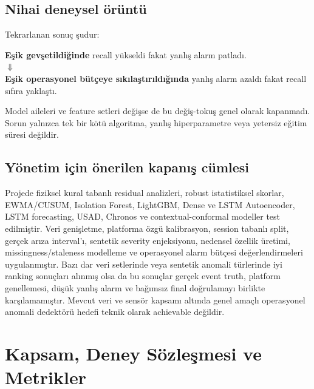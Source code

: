 \documentclass[11pt,a4paper,oneside]{report}
\begin{document}
\section{Nihai deneysel örüntü}

Tekrarlanan sonuç şudur:

\begin{center}
\begin{tcolorbox}[
  width=0.92\textwidth,
  colback=LightBlue,
  colframe=Blue,
  boxrule=0.7pt,
  arc=2mm
]
\centering\sffamily
\textbf{Eşik gevşetildiğinde} recall yükseldi fakat yanlış alarm patladı.\\[0.35em]
\(\Downarrow\)\\[-0.2em]
\textbf{Eşik operasyonel bütçeye sıkılaştırıldığında} yanlış alarm azaldı fakat recall sıfıra yaklaştı.
\end{tcolorbox}
\end{center}

Model aileleri ve feature setleri değişse de bu değiş-tokuş genel olarak
kapanmadı. Sorun yalnızca tek bir kötü algoritma, yanlış hiperparametre veya
yetersiz eğitim süresi değildir.

\section{Yönetim için önerilen kapanış cümlesi}

\begin{infobox}
Projede fiziksel kural tabanlı residual analizleri, robust istatistiksel
skorlar, EWMA/CUSUM, Isolation Forest, LightGBM, Dense ve LSTM Autoencoder,
LSTM forecasting, USAD, Chronos ve contextual-conformal modeller test
edilmiştir. Veri genişletme, platforma özgü kalibrasyon, session tabanlı
split, gerçek arıza interval'ı, sentetik severity enjeksiyonu, nedensel
özellik üretimi, missingness/staleness modelleme ve operasyonel alarm bütçesi
değerlendirmeleri uygulanmıştır. Bazı dar veri setlerinde veya sentetik
anomali türlerinde iyi ranking sonuçları alınmış olsa da bu sonuçlar gerçek
event truth, platform genellemesi, düşük yanlış alarm ve bağımsız final
doğrulamayı birlikte karşılamamıştır. Mevcut veri ve sensör kapsamı altında
genel amaçlı operasyonel anomali dedektörü hedefi teknik olarak achievable
değildir.
\end{infobox}

\chapter{Kapsam, Deney Sözleşmesi ve Metrikler}
\end{document}
